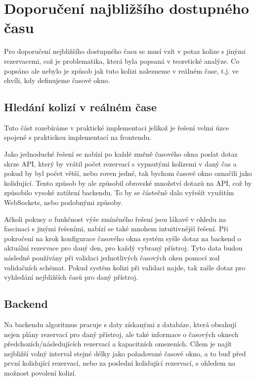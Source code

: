 \section{Doporučení najbližšího dostupného času}

Pro doporučení nejbližšího dostupného času se musí vzít v potaz kolize s jinými rezervacemi, což je problematika, která byla popsaná v teoretické analýze. Co popsáno ale nebylo je způsob jak tuto kolizi nalezneme v reálném čase, t.j. ve chvíli, kdy definujeme časové okno.

\subsection{Hledání kolizí v reálném čase}
Tuto část rozebíráme v praktické implementaci jelikož je řešení velmi úzce spojené s praktickou implementací na frontendu. 

Jako jednoduché řešení se nabízí po každé změně časového okna poslat dotaz skrze API, který by vrátil počet rezervací s vypnutými kolizemi v daný čas a pokud by byl počet větší, nebo roven jedné, tak bychom časové okno označili jako kolidující. Tento způsob by ale způsobil obrovské množství dotazů na API, což by způsobilo vysoké zatížení backendu. To by se částečně dalo vyřešít využitím WebSockets, nebo podobnými způsoby.

Ačkoli pokusy o funkčnost výše zmíněného řešení jsou lákavé v ohledu na fascinaci s jinými řešeními, nabízí se také mnohem intuitivnější řešení. Při pokročení na krok konfigurace časového okna systém syšle dotaz na backend o aktuální rezervace pro daný den, pro každý vybraný přístroj. Tyto data budou následně používány při validaci jednotlivých časových oken pomocí zod validačních schémat. Pokud systém kolizi při validaci najde, tak zašle dotaz pro vyhledání nejbližších časů pro daný přístroj.


\subsection{Backend}
Na backendu algoritmus pracuje s daty získanými z databáze, která obsahují nejen plány rezervací pro daný přístroj, ale také informace o časových oknech předchozích/následujících rezervací a kapacitních omezeních. Cílem je najít nejbližší volný interval stejné délky jako požadované časové okno, a to buď před první kolidující rezervací, nebo za poslední kolidující rezervací, s ohledem na možnost povolení kolizí.

